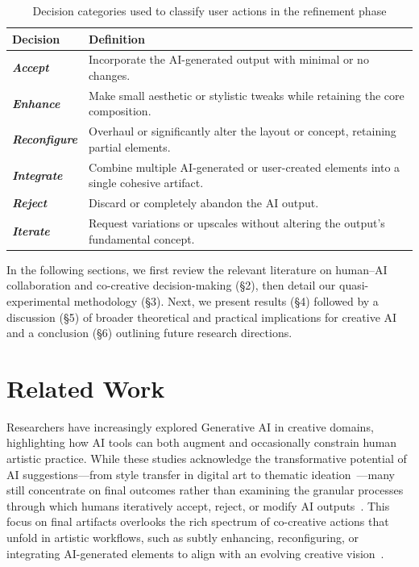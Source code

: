 \documentclass[letterpaper]{article} %
\begin{document}
\begin{table}[ht]
\centering
\caption{Decision categories used to classify user actions in the refinement phase}
\label{tab:decision-categories}
\begin{tabular}{lp{6cm}}
\hline
\textbf{Decision} & \textbf{Definition} \\
\hline
\textbf{\textit{Accept}} & Incorporate the AI-generated output with minimal or no changes. \\
\textbf{\textit{Enhance}} & Make small aesthetic or stylistic tweaks while retaining the core composition. \\
\textbf{\textit{Reconfigure}} & Overhaul or significantly alter the layout or concept, retaining partial elements. \\
\textbf{\textit{Integrate}} & Combine multiple AI-generated or user-created elements into a single cohesive artifact. \\
\textbf{\textit{Reject}} & Discard or completely abandon the AI output. \\
\textbf{\textit{Iterate}} & Request variations or upscales without altering the output's fundamental concept. \\
\hline
\end{tabular}
\end{table}

In the following sections, we first review the relevant literature on human–AI collaboration and co-creative decision-making (§2), then detail our quasi-experimental methodology (§3). Next, we present results (§4) followed by a discussion (§5) of broader theoretical and practical implications for creative AI and a conclusion (§6) outlining future research directions.

\section{Related Work}
Researchers have increasingly explored Generative AI in creative domains, highlighting how AI tools can both augment and occasionally constrain human artistic practice. While these studies acknowledge the transformative potential of AI suggestions—from style transfer in digital art to thematic ideation~\cite{dwivedi2023opinion,giordano2024impact}—many still concentrate on final outcomes rather than examining the granular processes through which humans iteratively accept, reject, or modify AI outputs~\cite{pena2021artificial,chen2019artificial}. This focus on final artifacts overlooks the rich spectrum of co-creative actions that unfold in artistic workflows, such as subtly enhancing, reconfiguring, or integrating AI-generated elements to align with an evolving creative vision~\cite{kim2023effect,takaffoli2024generative}.
\end{document}

